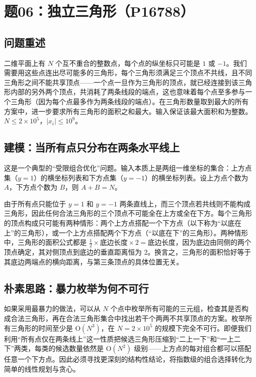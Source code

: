\section{题06：独立三角形（P16788）}

\subsection{问题重述}

二维平面上有 $N$ 个互不重合的整数点，每个点的纵坐标只可能是 $1$ 或 $-1$。我们需要用这些点连出尽可能多的三角形，每个三角形须满足三个顶点不共线，且不同三角形之间不能共享顶点——一个点一旦作为三角形的顶点，就已经连接到该三角形内部的另外两个顶点，共消耗了两条线段的端点，这也意味着每个点至多参与一个三角形（因为每个点最多作为两条线段的端点）。在三角形数量取到最大的所有方案中，进一步要求所有三角形的面积之和最大。输入保证该最大面积和为整数。$N \le 2 \times 10^5$，$|x_i| \le 10^9$。

\subsection{建模：当所有点只分布在两条水平线上}

这是一个典型的“受限组合优化”问题。输入本质上是两组一维坐标的集合：上方点集（$y = 1$）的横坐标列表和下方点集（$y = -1$）的横坐标列表。设上方点个数为 $A$，下方点个数为 $B$，则 $A + B = N$。

由于所有点只能位于 $y = 1$ 和 $y = -1$ 两条直线上，而三个顶点若共线则不能构成三角形，因此任何合法三角形的三个顶点不可能全在上方或全在下方。每个三角形的顶点构成只可能有两种情形：两个上方点搭配一个下方点（以下称为“以底在上”的三角形），或一个上方点搭配两个下方点（“以底在下”的三角形）。两种情形中，三角形的面积公式都是 $\frac12 \times \text{底边长度} \times 2 = \text{底边长度}$，因为底边由同侧的两个顶点确定，其对侧顶点到底边的垂直距离恒为 $2$。换言之，三角形的面积恰好等于其底边两端点的横向距离，与第三条顶点的具体位置无关。

\subsection{朴素思路：暴力枚举为何不可行}

如果采用最暴力的做法，可以从 $N$ 个点中枚举所有可能的三元组，检查其是否构成合法三角形，再在合法三角形集合中找出若干个两两不共享顶点的方案。枚举所有三角形的时间至少是 $\mathrm{O}(N^3)$，在 $N = 2 \times 10^5$ 的规模下完全不可行。即便我们利用“所有点仅在两条线上”这一性质把候选三角形压缩到“二上一下”和“一上二下”两类，每类的候选数量依然是 $\mathrm{O}(N^2)$ 级别——上方点的每对组合都可以搭配任意一个下方点。因此必须寻找更深刻的结构性结论，将指数级的组合选择转化为简单的线性规划与贪心。

